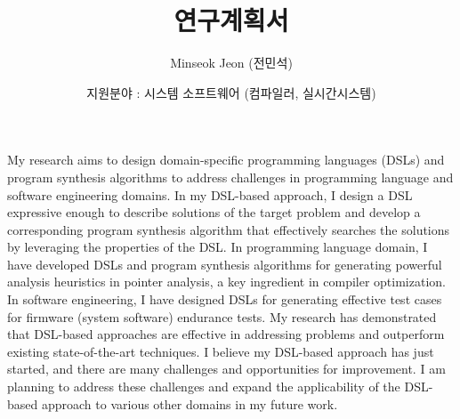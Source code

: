\documentclass[11pt]{article}
\begin{document}
\title{연구계획서}

\author{Minseok Jeon (전민석)}

\date{지원분야 : 시스템 소프트웨어 (컴파일러, 실시간시스템)}


\newcommand{\DisjunctiveModel}{\textsc{Disjunctive Model}}
\newcommand{\FeatureLanguage}{\textsc{Feature Language}}
\newcommand{\GDL}{\textsc{Graph Description Language}}


\newcommand{\AbstractRelativeWritePattern}{\textsc{Abstract Relative Write Pattern}}

\maketitle 

My research aims to design domain-specific programming languages (DSLs) and program synthesis algorithms to address challenges in programming language and software engineering domains. 
%
In my DSL-based approach, I design a DSL expressive enough to describe solutions of the target problem and develop a corresponding program synthesis algorithm that effectively searches the solutions by leveraging the properties of the DSL.
%
In programming language domain, I have developed DSLs and program synthesis algorithms for generating powerful analysis heuristics in pointer analysis, a key ingredient in compiler optimization.
%
In software engineering, I have designed DSLs for generating effective test cases for firmware (system software) endurance tests.
%
My research has demonstrated that DSL-based approaches are effective in addressing problems and outperform existing state-of-the-art techniques.
%
I believe my DSL-based approach has just started, and there are many challenges and opportunities for improvement. 
%
I am planning to address these challenges and expand the applicability of the DSL-based approach to various other domains in my future work.
%
%
\end{document}

